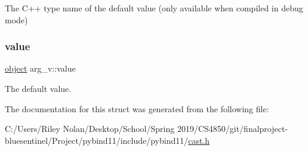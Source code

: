 The C++ type name of the default value (only available when compiled in debug mode) 

\mbox{\label{structarg__v_a3fe738ed6397b48b88244151dab53ee1}} 
\subsubsection{\texorpdfstring{value}{value}}
{\footnotesize\ttfamily \mbox{\hyperlink{classobject}{object}} arg\+\_\+v\+::value}



The default value. 



The documentation for this struct was generated from the following file\+:\begin{DoxyCompactItemize}
\item 
C\+:/\+Users/\+Riley Nolan/\+Desktop/\+School/\+Spring 2019/\+C\+S4850/git/finalproject-\/bluesentinel/\+Project/pybind11/include/pybind11/\mbox{\hyperlink{cast_8h}{cast.\+h}}\end{DoxyCompactItemize}

